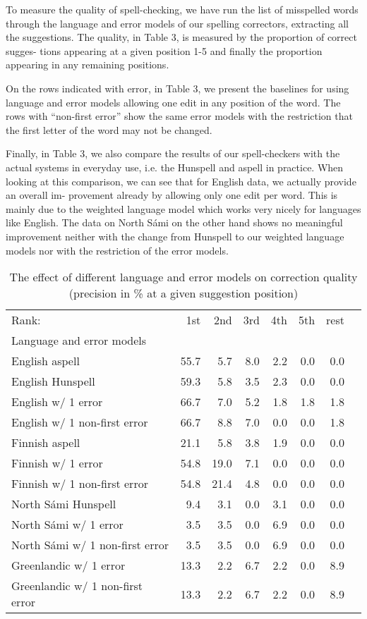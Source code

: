 \documentclass[postprint]{flammie}
\begin{document}
To measure the quality of spell-checking, we have run the list of misspelled
words through the language and error models of our spelling correctors,
extracting all the suggestions. The quality, in Table 3, is measured by the
proportion of correct sugges- tions appearing at a given position 1-5 and
finally the proportion appearing in any remaining positions.

On the rows indicated with error, in Table 3, we present the baselines for
using language and error models allowing one edit in any position of the word.
The rows with “non-first error” show the same error models with the restriction
that the first letter of the word may not be changed.

Finally, in Table 3, we also compare the results of our spell-checkers with the
actual systems in everyday use, i.e. the Hunspell and aspell in practice.
When looking at this comparison, we can see that for English data, we actually
provide an overall im- provement already by allowing only one edit per word.
This is mainly due to the weighted language model which works very nicely for
languages like English. The data on North Sámi on the other hand shows no
meaningful improvement neither with the change from Hunspell to our weighted
language models nor with the restriction of the error models.

\begin{table}
    \caption{The effect of different language and error models on correction quality (precision in \% at a given suggestion position)}
    \begin{tabular}{lrrrrrrr}
            Rank: & 1st & 2nd & 3rd & 4th & 5th & rest \\
            Language and error models & & & & & & \\
English aspell & 55.7 & 5.7 & 8.0 & 2.2 & 0.0 & 0.0 & \\
English Hunspell & 59.3 & 5.8 & 3.5 & 2.3 & 0.0 & 0.0 \\
        English w/ 1 error & 66.7 & 7.0 & 5.2 & 1.8 & 1.8 & 1.8 \\
        English w/ 1 non-first error & 66.7 & 8.8 & 7.0 & 0.0 & 0.0 & 1.8 \\
        Finnish aspell & 21.1 & 5.8 & 3.8 & 1.9 & 0.0 & 0.0 \\
        Finnish w/ 1 error & 54.8 & 19.0 & 7.1 & 0.0 & 0.0 & 0.0 \\
        Finnish w/ 1 non-first error & 54.8 & 21.4 & 4.8 & 0.0 & 0.0 & 0.0 \\
        North Sámi Hunspell & 9.4 & 3.1 & 0.0 & 3.1 & 0.0 & 0.0 \\
        North Sámi w/ 1 error & 3.5 & 3.5 & 0.0 & 6.9 & 0.0 & 0.0 \\
        North Sámi w/ 1 non-first error & 3.5 & 3.5 & 0.0 & 6.9 & 0.0 & 0.0 \\
        Greenlandic w/ 1 error & 13.3 & 2.2 & 6.7 & 2.2 & 0.0 & 8.9 \\
        Greenlandic w/ 1 non-first error & 13.3 & 2.2 & 6.7 & 2.2 & 0.0 & 8.9
    \end{tabular}
\end{table}
\end{document}
